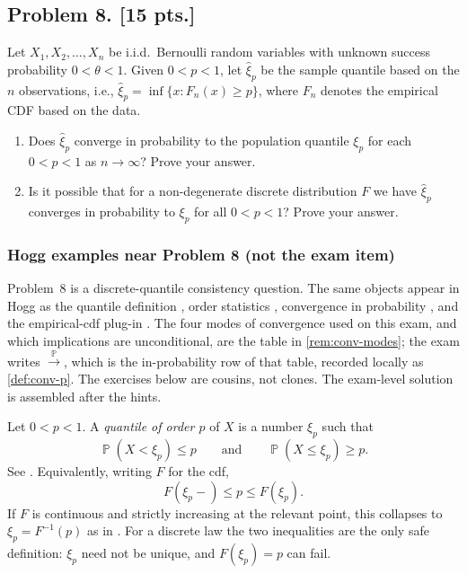 \documentclass[11pt,a4paper]{article}
\DeclareMathOperator{\Pbb}{\mathbb{P}}
\begin{document}
\subsection{Problem 8. [15 pts.]}
Let \( X_1, X_2, \dots, X_n \) be i.i.d.\ Bernoulli random variables with unknown success probability \( 0 < \theta < 1 \). Given \( 0 < p < 1 \), let \( \hat{\xi}_p \) be the sample quantile based on the \( n \) observations, i.e., \( \hat{\xi}_p = \inf\{x : F_n(x) \ge p\} \), where \( F_n \) denotes the empirical CDF based on the data.
\begin{enumerate}[label=(\alph*)]
    \item Does \( \hat{\xi}_p \) converge in probability to the population quantile \( \xi_p \) for each \( 0 < p < 1 \) as \( n \to \infty \)? Prove your answer.
    \item Is it possible that for a non-degenerate discrete distribution \( F \) we have \( \hat{\xi}_p \) converges in probability to \( \xi_p \) for all \( 0 < p < 1 \)? Prove your answer.
\end{enumerate}

\setcounter{section}{8}
\setcounter{definition}{0}

\subsubsection{Hogg examples near Problem 8 (not the exam item)}

Problem~8 is a discrete-quantile consistency question. The same objects appear in Hogg as the quantile definition \citep[Definition~1.7.2]{hogg2019}, order statistics \citep[\S4.4]{hogg2019}, convergence in probability \citep[\S5.1]{hogg2019}, and the empirical-cdf plug-in \citep[Remark~10.1.1, Exercise~10.1.3]{hogg2019}. The four modes of convergence used on this exam, and which implications are unconditional, are the table in \cref{rem:conv-modes}; the exam writes \(\xrightarrow{\Pbb}\), which is the in-probability row of that table, recorded locally as \cref{def:conv-p}. The exercises below are cousins, not clones. The exam-level solution is assembled after the hints.

\begin{definition}
\label{def:quantile}
Let \(0<p<1\). A \emph{quantile of order \(p\)} of \(X\) is a number \(\xi_p\) such that
\[
\Pbb(X<\xi_p)\le p
\qquad\text{and}\qquad
\Pbb(X\le\xi_p)\ge p.
\]
See \citep[Definition~1.7.2]{hogg2019}. Equivalently, writing \(F\) for the cdf,
\[
F(\xi_p-)\le p\le F(\xi_p).
\]
If \(F\) is continuous and strictly increasing at the relevant point, this collapses to \(\xi_p=F^{-1}(p)\) as in \citep[\S4.4.1]{hogg2019}. For a discrete law the two inequalities are the only safe definition: \(\xi_p\) need not be unique, and \(F(\xi_p)=p\) can fail.
\end{definition}
\end{document}
